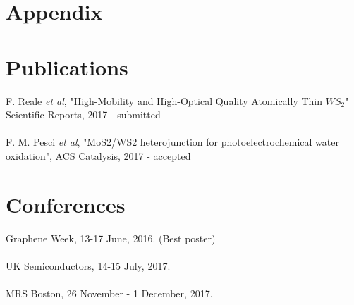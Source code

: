 \documentclass[12pt]{article}
\begin{document}
\section*{Appendix}

\section*{Publications}

F. Reale \textit{et al}, "High-Mobility and High-Optical Quality Atomically Thin $WS_2$" Scientific Reports, 2017 - submitted\\ \\
F. M. Pesci \textit{et al}, "MoS2/WS2 heterojunction for photoelectrochemical water oxidation", ACS Catalysis, 2017 - accepted

\section*{Conferences}

Graphene Week, 13-17 June, 2016. (Best poster)\\ \\
UK Semiconductors, 14-15 July, 2017.\\ \\
MRS Boston, 26 November - 1 December, 2017.


{}
\end{document}

